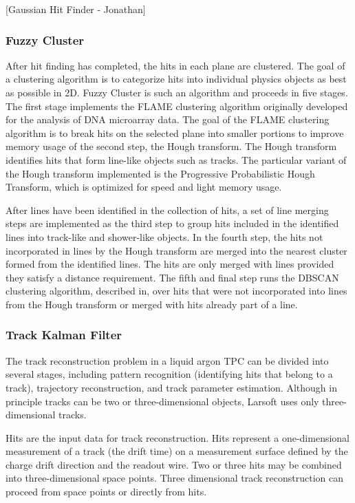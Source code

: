 \documentclass[12pt]{elsarticle}
\begin{document}
[Gaussian Hit Finder - Jonathan]


\subsubsection{Fuzzy Cluster}

After hit finding has completed, the hits in each plane are clustered. The goal of a clustering algorithm is to categorize hits into individual physics objects as best as possible in 2D. Fuzzy Cluster is such an algorithm and proceeds in five stages. The first stage implements the FLAME clustering algorithm originally developed for the analysis of DNA microarray data\cite{flame}. The goal of the FLAME clustering algorithm is to break hits on the selected plane into smaller portions to improve memory usage of the second step, the Hough transform. The Hough transform identifies hits that form line-like objects such as tracks. The particular variant of the Hough transform implemented is the Progressive Probabilistic Hough Transform, which is optimized for speed and light memory usage\cite{ppht}. 

After lines have been identified in the collection of hits, a set of line merging steps are implemented as the third step to group hits included in the identified lines into track-like and shower-like objects. In the fourth step, the hits not incorporated in lines by the Hough transform are merged into the nearest cluster formed from the identified lines. The hits are only merged with lines provided they satisfy a distance requirement. The fifth and final step runs the DBSCAN clustering algorithm, described in\cite{dbscan}, over hits that were not incorporated into lines from the Hough transform or merged with hits already part of a line. 


\subsubsection{Track Kalman Filter}

The track reconstruction problem in a liquid argon TPC can be
divided into several stages, including pattern recognition
(identifying hits that belong to a track), trajectory reconstruction,
and track parameter estimation. Although in principle tracks can be two or
three-dimensional objects, Larsoft uses only three-dimensional
tracks.

Hits are the input data for track reconstruction.  Hits
represent a one-dimensional measurement of a track (the
drift time) on a measurement surface defined by the charge drift
direction and the readout wire. Two or three hits may be combined
into three-dimensional space points. Three dimensional track
reconstruction can proceed from space points or directly from hits.
\end{document}
